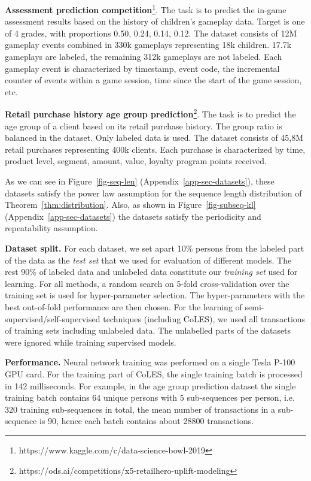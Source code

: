 \documentclass{article}
\begin{document}
\textbf{Assessment prediction competition}\footnote{https://www.kaggle.com/c/data-science-bowl-2019}. The task is to predict the in-game assessment results based on the history of children's gameplay data. Target is one of 4 grades, with proportions 0.50, 0.24, 0.14, 0.12. The dataset consists of 12M gameplay events combined in 330k gameplays representing 18k children. 17.7k gameplays are labeled, the remaining 312k gameplays are not labeled. Each gameplay event is characterized by timestamp, event code, the incremental counter of events within a game session, time since the start of the game session, etc.

\textbf{Retail purchase history age group prediction}\footnote{https://ods.ai/competitions/x5-retailhero-uplift-modeling}. The task is to predict the age group of a client based on its retail purchase history. The group ratio is balanced in the dataset. Only labeled data is used. The dataset consists of 45,8M retail purchases representing 400k clients. Each purchase is characterized by time, product level, segment, amount, value, loyalty program points received.

As we can see in Figure~\ref{fig-seq-len} (Appendix~\ref{app-sec-datasets}), these datasets satisfy the power law assumption for the sequence length distribution of Theorem~\ref{thm:distribution}. Also, as shown in Figure~\ref{fig-subseq-kl} (Appendix~\ref{app-sec-datasets}) the datasets satisfy the periodicity and repeatability assumption.


\textbf{Dataset split.} For each dataset, we set apart 10\% persons from the labeled part of the data as the \textit{test set} that we used for evaluation of different models. The rest 90\% of labeled data and unlabeled data constitute our \textit{training set} used for learning. For all methods, a random search on 5-fold cross-validation over the training set is used for hyper-parameter selection. The hyper-parameters with the best out-of-fold performance are then chosen.
For the learning of semi-supervised/self-supervised techniques (including CoLES), we used all transactions of training sets including unlabeled data. The unlabelled parts of the datasets were ignored while training supervised models.

\textbf{Performance.} Neural network training was performed on a single Tesla P-100 GPU card. For the training part of CoLES, the single training batch is processed in 142 milliseconds. For example, in the age group prediction dataset the single training batch contains 64 unique persons with 5 sub-sequences per person, i.e. 320 training sub-sequences in total, the mean number of transactions in a sub-sequence is 90, hence each batch contains about 28800 transactions.
\end{document}
